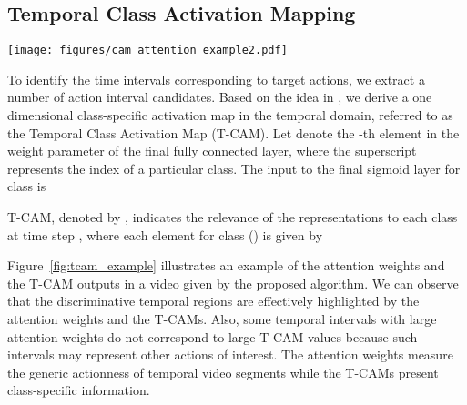 \documentclass[10pt,twocolumn,letterpaper]{article}
\begin{document}
\subsection{Temporal Class Activation Mapping}
\label{sub:temporal}
\begin{figure*}[ht]
\captionsetup{font=small}
\centering
\texttt{[image: figures/cam\_attention\_example2.pdf]}
    \caption{Illustration of the ground-truth temporal intervals for the {\it ThrowDiscus} class, the temporal attentions, and the T-CAM for an example video in the THUMOS14 dataset~\cite{jiang14thumos}. The horizontal axis in the plots denote the timestamps. In this example, the T-CAM values for {\it ThrowDiscus} provide accurate action localization information.  Note that the temporal attention weights are large at several locations that do not correspond to the ground-truth annotations.  This is because temporal attention weights are trained in a class-agnostic way.}
\label{fig:tcam_example}
\end{figure*}
To identify the time intervals corresponding to target actions, we extract a number of action interval candidates.
Based on the idea in \cite{zhou16learning}, we derive a one dimensional class-specific activation map in the temporal domain, referred to as the Temporal Class Activation Map (T-CAM).
Let  denote the -th element in the weight parameter  of the final fully connected layer, where the superscript  represents the index of a particular class.
The input to the final sigmoid layer for class  is



T-CAM, denoted by , indicates the relevance of the representations to each class at time step , where each element  for class  () is given by



Figure~\ref{fig:tcam_example} illustrates an example of the attention weights and the T-CAM outputs in a video given by the proposed algorithm.
We can observe that the discriminative temporal regions are effectively highlighted by the attention weights and the T-CAMs.
Also, some temporal intervals with large attention weights do not correspond to large T-CAM values because such intervals may represent other actions of interest.
The attention weights measure the generic actionness of temporal video segments while the T-CAMs present class-specific information.
\end{document}
